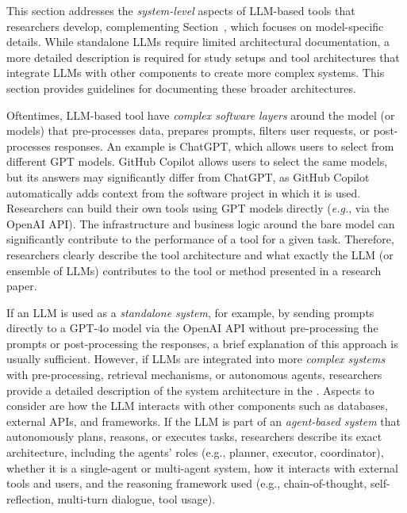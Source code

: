 This section addresses the \emph{system-level} aspects of LLM-based tools that researchers develop, complementing Section~\modelversion, which focuses on model-specific details.
While standalone LLMs require limited architectural documentation, a more detailed description is required for study setups and tool architectures that integrate LLMs with other components to create more complex systems.
This section provides guidelines for documenting these broader architectures.


Oftentimes, LLM-based tool have \emph{complex software layers} around the model (or models) that pre-processes data, prepares prompts, filters user requests, or post-processes responses.
An example is ChatGPT, which allows users to select from different GPT models.
GitHub Copilot allows users to select the same models, but its answers may significantly differ from ChatGPT, as GitHub Copilot automatically adds context from the software project in which it is used.
Researchers can build their own tools using GPT models directly (\textit{e.g.}, via the OpenAI API).
The infrastructure and business logic around the bare model can significantly contribute to the performance of a tool for a given task.
Therefore, researchers \must clearly describe the tool architecture and what exactly the LLM (or ensemble of LLMs) contributes to the tool or method presented in a research paper.

If an LLM is used as a \emph{standalone system}, for example, by sending prompts directly to a GPT-4o model via the OpenAI API without pre-processing the prompts or post-processing the responses, a brief explanation of this approach is usually sufficient.
However, if LLMs are integrated into more \emph{complex systems} with pre-processing, retrieval mechanisms, or autonomous agents, researchers \must provide a detailed description of the system architecture in the \paper.
Aspects to consider are how the LLM interacts with other components such as databases, external APIs, and frameworks.
If the LLM is part of an \emph{agent-based system} that autonomously plans, reasons, or executes tasks, researchers \must describe its exact architecture, including the agents' roles (e.g., planner, executor, coordinator), whether it is a single-agent or multi-agent system, how it interacts with external tools and users, and the reasoning framework used (e.g., chain-of-thought, self-reflection, multi-turn dialogue, tool usage).

